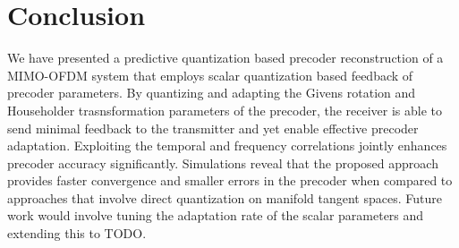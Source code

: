 \documentclass[journal,10pt,twocolumn]{IEEEtran}
\begin{document}



\section{Conclusion}
\label{section4}
We have presented a predictive quantization based precoder
reconstruction of a MIMO-OFDM system that employs scalar quantization
based feedback of precoder parameters. By quantizing and adapting the
Givens rotation and Householder trasnsformation parameters of the
precoder, the receiver is able to send minimal feedback to the
transmitter and yet enable effective precoder adaptation. Exploiting
the temporal and frequency correlations jointly enhances precoder
accuracy significantly. Simulations reveal that the proposed approach
provides faster convergence and smaller errors in the precoder when
compared to approaches that involve direct quantization on manifold
tangent spaces. Future work would involve tuning the adaptation rate
of the scalar parameters and extending this to TODO.














\renewcommand{\bibfont}{\footnotesize}




\end{document}
